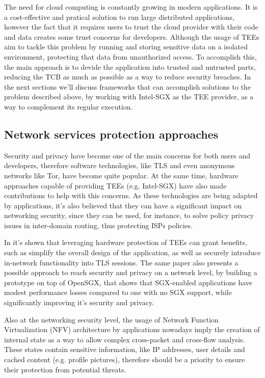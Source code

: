 The need for cloud computing is constantly growing in modern applications. It is a cost-effective and pratical solution to run large distributed applications, however the fact that it requires users to trust the cloud provider with their code and data creates some trust concerns for developers.
Although the usage of TEEs aim to tackle this problem by running and storing sensitive data on a isolated environment, protecting that data from unauthorized access. To accomplish this, the main approach is to devide the application into trusted and untrusted parts, reducing the TCB as much as possible as a way to reduce security breaches. 
In the next sections we'll discuss frameworks that can accomplish solutions to the problem described above, by working with Intel-SGX as the TEE provider, as a way to complement its regular execution.



\subsection{Network services protection approaches}
\label{ssec:sgx_network_frameworks}

Security and privacy have become one of the main concerns for both users and developers, therefore software technologies, like TLS and even anonymous networks like Tor, have become quite popular. At the same time, hardware approaches capable of providing TEEs (e.g. Intel-SGX) have also made contributions to help with this concerns. 
As these technologies are being adapted by applications, it's also believed that they can have a significant impact on networking security, since they can be used, for instance, to solve policy privacy issues in inter-domain routing, thus protecting ISPs policies. 

In \cite{torSGXPaper} it's shown that leveraging hardware protection of TEEs can grant benefits, such as simplify the overall design of the application, as well as securely introduce in-network functionality into TLS sessions. 
The same paper also presents a possible approach to reach security and privacy on a network level, by building a prototype on top of OpenSGX, that shows that SGX-enabled applications have modest performance losses compared to one with no SGX support, while significantly improving it's security and privacy.

Also at the networking security level, the usage of Network Function Virtualization (NFV) architecture by applications nowadays imply the creation of internal state as a way to allow complex cross-packet and cross-flow analysis. These states contain sensitive information, like IP addresses, user details and cached content (e.g. profile pictures), therefore should be a priority to ensure their protection from potential threats. 

